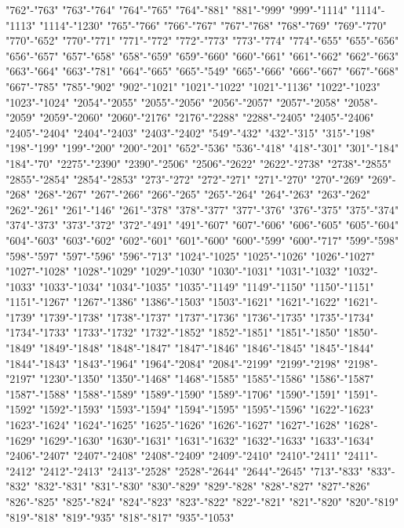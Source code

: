 \documentclass[12pt]{amsart}
\begin{document}
{"762"-"763" 
"763"-"764" 
"764"-"765" 
"764"-"881" 
"881"-"999" 
"999"-"1114" 
"1114"-"1113" 
"1114"-"1230" 
"765"-"766" 
"766"-"767" 
"767"-"768" 
"768"-"769" 
"769"-"770" 
"770"-"652" 
"770"-"771" 
"771"-"772" 
"772"-"773" 
"773"-"774" 
"774"-"655" 
"655"-"656" 
"656"-"657" 
"657"-"658" 
"658"-"659" 
"659"-"660" 
"660"-"661" 
"661"-"662" 
"662"-"663" 
"663"-"664" 
"663"-"781" 
"664"-"665" 
"665"-"549" 
"665"-"666" 
"666"-"667" 
"667"-"668" 
"667"-"785" 
"785"-"902" 
"902"-"1021" 
"1021"-"1022" 
"1021"-"1136" 
"1022"-"1023" 
"1023"-"1024" 
"2054"-"2055" 
"2055"-"2056" 
"2056"-"2057" 
"2057"-"2058" 
"2058"-"2059" 
"2059"-"2060" 
"2060"-"2176" 
"2176"-"2288" 
"2288"-"2405" 
"2405"-"2406" 
"2405"-"2404" 
"2404"-"2403" 
"2403"-"2402" 
"549"-"432" 
"432"-"315" 
"315"-"198" 
"198"-"199" 
"199"-"200" 
"200"-"201" 
"652"-"536" 
"536"-"418" 
"418"-"301" 
"301"-"184" 
"184"-"70" 
"2275"-"2390" 
"2390"-"2506" 
"2506"-"2622" 
"2622"-"2738" 
"2738"-"2855" 
"2855"-"2854" 
"2854"-"2853" 
"273"-"272" 
"272"-"271" 
"271"-"270" 
"270"-"269" 
"269"-"268" 
"268"-"267" 
"267"-"266" 
"266"-"265" 
"265"-"264" 
"264"-"263" 
"263"-"262" 
"262"-"261" 
"261"-"146" 
"261"-"378" 
"378"-"377" 
"377"-"376" 
"376"-"375" 
"375"-"374" 
"374"-"373" 
"373"-"372" 
"372"-"491" 
"491"-"607" 
"607"-"606" 
"606"-"605" 
"605"-"604" 
"604"-"603" 
"603"-"602" 
"602"-"601" 
"601"-"600" 
"600"-"599" 
"600"-"717" 
"599"-"598" 
"598"-"597" 
"597"-"596" 
"596"-"713" 
"1024"-"1025" 
"1025"-"1026" 
"1026"-"1027" 
"1027"-"1028" 
"1028"-"1029" 
"1029"-"1030" 
"1030"-"1031" 
"1031"-"1032" 
"1032"-"1033" 
"1033"-"1034" 
"1034"-"1035" 
"1035"-"1149" 
"1149"-"1150" 
"1150"-"1151" 
"1151"-"1267" 
"1267"-"1386" 
"1386"-"1503" 
"1503"-"1621" 
"1621"-"1622" 
"1621"-"1739" 
"1739"-"1738" 
"1738"-"1737" 
"1737"-"1736" 
"1736"-"1735" 
"1735"-"1734" 
"1734"-"1733" 
"1733"-"1732" 
"1732"-"1852" 
"1852"-"1851" 
"1851"-"1850" 
"1850"-"1849" 
"1849"-"1848" 
"1848"-"1847" 
"1847"-"1846" 
"1846"-"1845" 
"1845"-"1844" 
"1844"-"1843" 
"1843"-"1964" 
"1964"-"2084" 
"2084"-"2199" 
"2199"-"2198" 
"2198"-"2197" 
"1230"-"1350" 
"1350"-"1468" 
"1468"-"1585" 
"1585"-"1586" 
"1586"-"1587" 
"1587"-"1588" 
"1588"-"1589" 
"1589"-"1590" 
"1589"-"1706" 
"1590"-"1591" 
"1591"-"1592" 
"1592"-"1593" 
"1593"-"1594" 
"1594"-"1595" 
"1595"-"1596" 
"1622"-"1623" 
"1623"-"1624" 
"1624"-"1625" 
"1625"-"1626" 
"1626"-"1627" 
"1627"-"1628" 
"1628"-"1629" 
"1629"-"1630" 
"1630"-"1631" 
"1631"-"1632" 
"1632"-"1633" 
"1633"-"1634" 
"2406"-"2407" 
"2407"-"2408" 
"2408"-"2409" 
"2409"-"2410" 
"2410"-"2411" 
"2411"-"2412" 
"2412"-"2413" 
"2413"-"2528" 
"2528"-"2644" 
"2644"-"2645" 
"713"-"833" 
"833"-"832" 
"832"-"831" 
"831"-"830" 
"830"-"829" 
"829"-"828" 
"828"-"827" 
"827"-"826" 
"826"-"825" 
"825"-"824" 
"824"-"823" 
"823"-"822" 
"822"-"821" 
"821"-"820" 
"820"-"819" 
"819"-"818" 
"819"-"935" 
"818"-"817" 
"935"-"1053" 
} 
\end{document}
